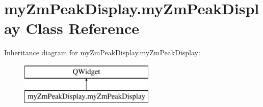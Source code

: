 \hypertarget{classmyZmPeakDisplay_1_1myZmPeakDisplay}{\section{my\-Zm\-Peak\-Display.\-my\-Zm\-Peak\-Display Class Reference}
\label{classmyZmPeakDisplay_1_1myZmPeakDisplay}
}
Inheritance diagram for my\-Zm\-Peak\-Display.\-my\-Zm\-Peak\-Display\-:\begin{figure}[H]
\begin{center}
\leavevmode
\includegraphics[height=2.000000cm]{classmyZmPeakDisplay_1_1myZmPeakDisplay}
\end{center}
\end{figure}
